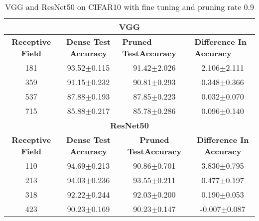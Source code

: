 \begin{table}[H]
\begin{tabular}{@{}cccc@{}}
\toprule
\multicolumn{4}{c}{\textbf{VGG}}                                                                                                                                  \\ \midrule
\textbf{Receptive Field} & \textbf{Dense Test Accuracy} & \multicolumn{1}{l}{\textbf{Pruned  TestAccuracy}} & \multicolumn{1}{l}{\textbf{Difference In Accuracy}} \\ \midrule
181                      & 93.52$\pm$0.115              & 91.42$\pm$2.026                                   & 2.106$\pm$2.111                                     \\
359                      & 91.15$\pm$0.232              & 90.81$\pm$0.293                                   & 0.348$\pm$0.366                                     \\
537                      & 87.88$\pm$0.193              & 87.85$\pm$0.223                                   & 0.032$\pm$0.070                                     \\
715                      & 85.88$\pm$0.217              & 85.78$\pm$0.286                                   & 0.096$\pm$0.140                                     \\ \midrule
\multicolumn{4}{c}{\textbf{ResNet50}}                                                                                                                             \\ \midrule
\textbf{Receptive Field} & \textbf{Dense Test Accuracy} & \textbf{Pruned  TestAccuracy}                     & \textbf{Difference In Accuracy}                     \\
110                      & 94.69$\pm$0.213              & 90.86$\pm$0.701                                   & 3.830$\pm$0.795                                     \\
213                      & 94.03$\pm$0.236              & 93.55$\pm$0.211                                   & 0.477$\pm$0.197                                     \\
318                      & 92.22$\pm$0.244              & 92.03$\pm$0.200                                   & 0.190$\pm$0.053                                     \\
423                      & 90.23$\pm$0.169              & 90.23$\pm$0.147                                   & -0.007$\pm$0.087                                    \\ \bottomrule
\end{tabular}
\caption{VGG and ResNet50 on CIFAR10 with fine tuning and pruning rate 0.9}
\label{tab:cifar10 fine tuning pruning rate 09}
\end{table}


